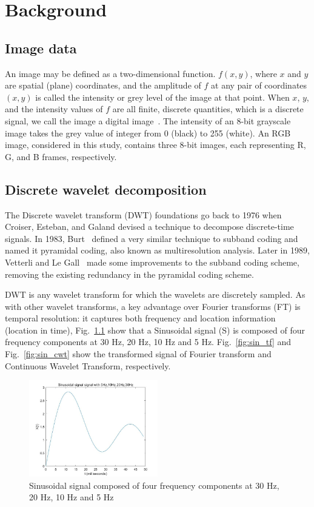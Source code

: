 \chapter{Background}
\label{cp:Background}

\section{Image data}
An image may be defined as a two-dimensional function. $f(x,y)$, where $x$ and $y$ are spatial (plane) coordinates, and the amplitude of $f$ at any pair of coordinates $(x,y)$ is called the intensity or grey level of the image at that point. When $x$, $y$, and the intensity values of $f$ are all finite, discrete quantities, which is a discrete signal, we call the image a digital image~\cite{gonzalez2002digital}. The intensity of an 8-bit grayscale image takes the grey value of integer from 0 (black) to 255 (white). An RGB image, considered in this study, contains three 8-bit images, each representing R, G, and B frames, respectively. 

\section{Discrete wavelet decomposition}

The Discrete wavelet transform (DWT) foundations go back to 1976 when Croiser, Esteban, and Galand devised a technique to decompose discrete-time signals\nocite{croisier1976perfect}. In 1983, Burt ~\nocite{Burt1983TheLP}defined a very similar technique to subband coding and named it pyramidal coding, also known as multiresolution analysis. Later in 1989, Vetterli and Le Gall~\nocite{vetterli1989perfect} made some improvements to the subband coding scheme, removing the existing redundancy in the pyramidal coding scheme.

DWT is any wavelet transform for which the wavelets are discretely sampled. As with other wavelet transforms, a key advantage over Fourier transforms (FT) is temporal resolution: it captures both frequency and location information (location in time), Fig.~\ref{fig:sin_signal} show that a Sinusoidal signal (S) is composed of four frequency components at 30 Hz, 20 Hz, 10 Hz and 5 Hz. Fig.~\ref{fig:sin_tf} and Fig.~\ref{fig:sin_cwt} show the transformed signal of Fourier transform and Continuous Wavelet Transform, respectively. 

\begin{figure}[h]
\centering
\includegraphics[width=0.5\textwidth]{images/signal_sin.jpg}
\caption{Sinusoidal signal composed of four frequency components at 30 Hz, 20 Hz, 10 Hz and 5 Hz}
\label{fig:sin_signal}
\end{figure}


